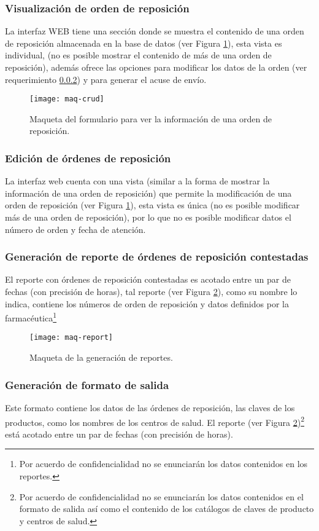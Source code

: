 \subsubsection{Visualización de orden de reposición}
La interfaz WEB tiene una sección donde se muestra el contenido de una orden de reposición almacenada en la base de datos (ver Figura \ref{fig:maq-crud}), esta vista es individual, (no es posible mostrar el contenido de más de una orden de reposición), además ofrece las opciones para modificar los datos de la orden (ver requerimiento \ref{req-edicion}) y para generar el acuse de envío.
\begin{figure}[h]
  \centering
  \texttt{[image: maq-crud]} 
  \caption{Maqueta del formulario para ver la información de una orden de reposición.}
  \label{fig:maq-crud}
\end{figure} 

\subsubsection{Edición de órdenes de reposición}\label{req-edicion}
La interfaz web cuenta con una vista (similar a la forma de mostrar la información de una orden de reposición) que permite la modificación de una orden de reposición (ver Figura \ref{fig:maq-crud}), esta vista es única (no es posible modificar más de una orden de reposición), por lo que no es posible modificar datos el número de orden y fecha de atención.

\subsubsection{Generación de reporte de órdenes de reposición contestadas}
El reporte con órdenes de reposición contestadas es acotado entre un par de fechas (con precisión de horas), tal reporte (ver Figura \ref{fig:maq-report}), como su nombre lo indica, contiene los números de orden de reposición y datos definidos por la farmacéutica\footnote{Por acuerdo de confidencialidad no se enunciarán los datos contenidos en los reportes.}
\begin{figure}[h]
  \centering
  \texttt{[image: maq-report]} 
  \caption{Maqueta de la generación de reportes.}
  \label{fig:maq-report}
\end{figure} 

\subsubsection{Generación de formato de salida}
Este formato contiene los datos de las órdenes de reposición, las claves de los productos, como los nombres de los centros de salud. El reporte (ver Figura \ref{fig:maq-report})\footnote{Por acuerdo de confidencialidad no se enunciarán los datos contenidos en el formato de salida así como el contenido de los catálogos de claves de producto y centros de salud.} está acotado entre un par de fechas (con precisión de horas).

